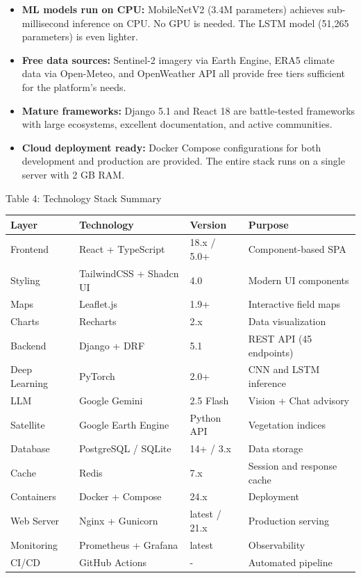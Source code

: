 \documentclass[12pt, a4paper]{report}
\begin{document}
\begin{itemize}[leftmargin=*]
  \item \textbf{ML models run on CPU:} MobileNetV2 (3.4M parameters) achieves sub-millisecond inference on CPU. No GPU is needed. The LSTM model (51,265 parameters) is even lighter.
  \item \textbf{Free data sources:} Sentinel-2 imagery via Earth Engine, ERA5 climate data via Open-Meteo, and OpenWeather API all provide free tiers sufficient for the platform's needs.
  \item \textbf{Mature frameworks:} Django 5.1 and React 18 are battle-tested frameworks with large ecosystems, excellent documentation, and active communities.
  \item \textbf{Cloud deployment ready:} Docker Compose configurations for both development and production are provided. The entire stack runs on a single server with 2 GB RAM.
\end{itemize}
Table 4: Technology Stack Summary

\begin{table}[htbp]
\centering
\small
\begin{tabularx}{\textwidth}{|X|X|X|X|}
\hline
Layer & Technology & Version & Purpose \\
\hline
Frontend & React + TypeScript & 18.x / 5.0+ & Component-based SPA \\
Styling & TailwindCSS + Shadcn UI & 4.0 & Modern UI components \\
Maps & Leaflet.js & 1.9+ & Interactive field maps \\
Charts & Recharts & 2.x & Data visualization \\
Backend & Django + DRF & 5.1 & REST API (45 endpoints) \\
Deep Learning & PyTorch & 2.0+ & CNN and LSTM inference \\
LLM & Google Gemini & 2.5 Flash & Vision + Chat advisory \\
Satellite & Google Earth Engine & Python API & Vegetation indices \\
Database & PostgreSQL / SQLite & 14+ / 3.x & Data storage \\
Cache & Redis & 7.x & Session and response cache \\
Containers & Docker + Compose & 24.x & Deployment \\
Web Server & Nginx + Gunicorn & latest / 21.x & Production serving \\
Monitoring & Prometheus + Grafana & latest & Observability \\
CI/CD & GitHub Actions & - & Automated pipeline \\
\hline
\end{tabularx}
\end{table}
\end{document}
